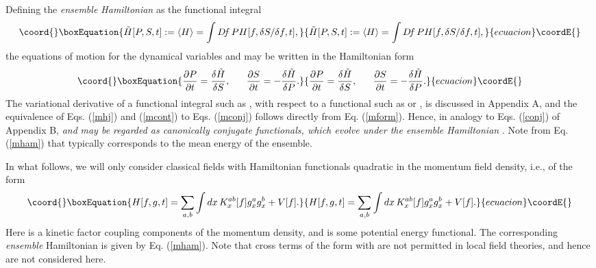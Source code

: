 \documentclass[a4paper,preprint, showpacs, aps, draft]{revtex4}
\begin{document}
{Defining the {\it ensemble Hamiltonian} \coordHE{}
as the functional integral
\begin{equation}\coord{}\boxEquation{ \label{mham}
\tilde{H}[P, S, t]:= \langle H\rangle = \int D\!f\, PH[f, \delta
S/\delta f, t] ,
}{ \tilde{H}[P, S, t]:= \langle H\rangle = \int D\!f\, PH[f, \delta
S/\delta f, t] ,
}{ecuacion}\coordE{}\end{equation}
the equations of motion for the dynamical variables 
\coordHE{} and \coordHE{} may be written in the
Hamiltonian form
\begin{equation}\coord{}\boxEquation{ \label{mconj}
\frac{\partial P}{\partial t} = \frac{\delta\tilde{H}}{\delta S}, ~~~~~
\frac{\partial S}{\partial t} = - \frac{\delta\tilde{H}}{\delta P} .
}{ \frac{\partial P}{\partial t} = \frac{\delta\tilde{H}}{\delta S}, ~~~~~
\frac{\partial S}{\partial t} = - \frac{\delta\tilde{H}}{\delta P} .
}{ecuacion}\coordE{}\end{equation}
The variational derivative of a functional integral such as \coordHE{},
with respect to a functional such as \coordHE{} or \coordHE{}, is
discussed in Appendix A, and
the equivalence of Eqs. (\ref{mhj})
and (\ref{mcont}) to Eqs. (\ref{mconj}) follows directly from Eq.
(\ref{mform}).
Hence, in analogy to Eqs. (\ref{conj})
of Appendix B, \coordHE{} {\it and} \coordHE{} {\it may be regarded as 
canonically conjugate functionals, 
which evolve under the ensemble Hamiltonian} \coordHE{} \cite{footact}.  Note 
from Eq. (\ref{mham}) that \coordHE{} typically corresponds to the mean
energy of the ensemble.   

In what follows, we will only consider classical fields with 
Hamiltonian functionals quadratic in the momentum field
density, i.e., of the form
\begin{equation}\coord{}\boxEquation{ \label{hquad}
H[f, g, t] = \sum_{a,b}\int dx\, K^{ab}_{x}[f] g^a_xg^b_x + V[f] .
}{ H[f, g, t] = \sum_{a,b}\int dx\, K^{ab}_{x}[f] g^a_xg^b_x + V[f] .
}{ecuacion}\coordE{}\end{equation}
Here \coordHE{} is a kinetic factor coupling components
of the momentum density, and \coordHE{} is some potential energy functional. 
The corresponding
{\it ensemble} Hamiltonian is given by Eq. (\ref{mham}).  Note that cross terms
of the form \coordHE{} with \coordHE{}
are not permitted in local field theories, and
hence are not considered here. 

}
\end{document}
